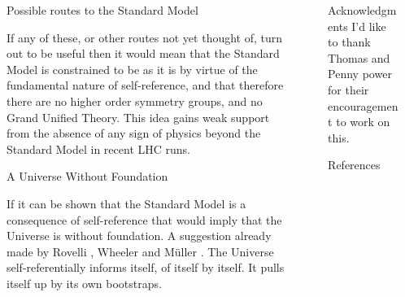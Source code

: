 \documentclass[final]{beamer}
\newlength{\sepwidth}
\newlength{\colwidth}
\newcommand{\separatorcolumn}{\begin{column}{\sepwidth}\end{column}}
\begin{document}
\begin{frame}[t]
\begin{columns}[t]
\begin{column}{\colwidth}
\begin{block}{Possible routes to the Standard Model}
\begin{enumerate}
    \end{enumerate}
 If any of these, or other routes not yet thought of, turn out to be useful then it would mean that the Standard Model is constrained to be as it is by virtue of the fundamental nature of self-reference, and that therefore there are no higher order symmetry groups, and no Grand Unified Theory. This idea gains weak support from the absence of any sign of physics beyond the Standard Model in recent LHC runs.
  \end{block}
\begin{block}{A Universe Without Foundation}

    If it can be shown that the Standard Model is a consequence of self-reference that would imply that the Universe is without foundation. A suggestion already made by Rovelli \autocite{rovelli_helgoland_2021}, Wheeler \autocite{wheeler_1986} and M\"{u}ller \autocite{Mueller2017}. The Universe self-referentially informs itself, of itself by itself. It pulls itself up by its own bootstraps. 

  \end{block}
\end{column}

\separatorcolumn

\begin{column}{\colwidth}
 
  \begin{block}{Acknowledgments}
   I'd like to thank Thomas and Penny power for their encouragement to work on this.
  \end{block}
  \begin{block}{References}
    \printbibliography
  \end{block}

\end{column}

\separatorcolumn
\end{columns}
\end{frame}
\end{document}
